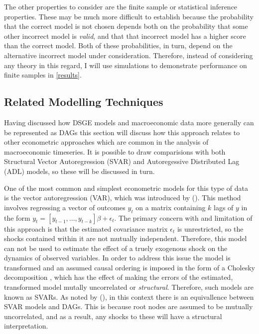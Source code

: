\documentclass{article}
\begin{document}
The other properties to consider are the finite sample or statistical inference properties. These may be much more difficult to establish because the probability that the correct model is not chosen depends both on the probability that some other incorrect model is \textit{valid}, and that that incorrect model has a higher score than the correct model. Both of these probabilities, in turn, depend on the alternative incorrect model under consideration. Therefore, instead of considering any theory in this regard, I will use simulations to demonstrate performance on finite samples in \ref{results}.

\subsection{Related Modelling Techniques}

Having discussed how DSGE models and macroeconomic data more generally can be represented as DAGs this section will discuss how this approach relates to other econometric approaches which are common in the analysis of macroeconomic timeseries. It is possible to draw comparisions with both Structural Vector Autoregression (SVAR) and Autoregessive Distributed Lag (ADL) models, so these will be discussed in turn.

One of the most common and simplest econometric models for this type of data is the vector autoregression (VAR), which was introduced by \citeauthor{sims1980macroeconomics} (\citeyear{sims1980macroeconomics}). This method involves regressing a vector of outcomes $y_t$ on a matrix containing $k$ lags of $y$ in the form $y_t = [y_{t-1}, ..., y_{t-k}] \beta + \epsilon_t $. The primary concern with and limitation of this approach is that the estimated covariance matrix $\epsilon_t$ is unrestricted, so the shocks contained within it are not mutually independent. Therefore, this model can not be used to estimate the effect of a truely exogenous shock on the dynamics of observed variables. In order to address this issue the model is transformed and an assumed causal ordering is imposed in the form of a Cholesky decomposition \parencite{sims1980macroeconomics}, which has the effect of making the errors of the estimated, transformed model mutally uncorrelated or \textit{structural}. Therefore, such models are known as SVARs. As noted by \citeauthor{demiralp2003searching} (\citeyear{demiralp2003searching}), in this context there is an equivallence between SVAR models and DAGs. This is because root nodes are assumed to be mutually uncorrelated, and as a result, any shocks to these will have a structural interpretation.
\end{document}
